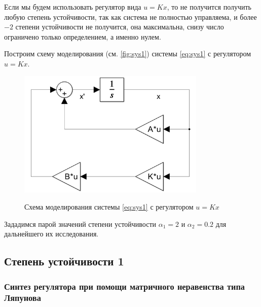 Если мы будем использовать регулятор вида $u=Kx$, то не получится получить
любую степень устойчивости, так как система не полностью управляема, и
более $-2$ степени устойчивости не получится, она максимальна, снизу число ограничено 
только определением, а именно нулем.

Построим схему моделирования (см. \autoref{fig:sys1}) системы \eqref{eq:sys1} с регулятором $u=Kx$.
\begin{figure}[H]
    \centering
    \caption{Схема моделирования системы \eqref{eq:sys1} с регулятором $u=Kx$}
    \includegraphics[width=0.8\textwidth]{figs/task1_slx.png}
    \label{fig:sys1}
\end{figure}

Зададимся парой значений степени устойчивости $\alpha_1=2$ и $\alpha_2=0.2$
для дальнейшего их исследования.



\subsection{Степень устойчивости 1}

\subsubsection{Синтез регулятора при помощи матричного неравенства
типа Ляпунова} \label{sec:lyapexp}

